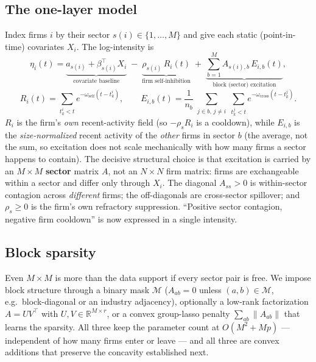 \documentclass[11pt]{article}
\theoremstyle{plain}
\theoremstyle{definition}
\theoremstyle{remark}
\newcommand{\R}{\mathbb{R}}
\begin{document}
\subsection{The one-layer model}
Index firms $i$ by their sector $s(i)\in\{1,\dots,M\}$ and give each static (point-in-time) covariates $X_i$. The log-intensity is
\begin{equation}
\eta_i(t)=\underbrace{a_{s(i)}+\beta_{s(i)}^\top X_i}_{\text{covariate baseline}}
\;-\;\underbrace{\rho_{s(i)}\,R_i(t)}_{\text{firm self-inhibition}}
\;+\;\underbrace{\sum_{b=1}^{M} A_{s(i),b}\,E_{i,b}(t)}_{\text{block (sector) excitation}},
\label{eq:bh_eta}
\end{equation}
\begin{equation}
R_i(t)=\!\!\sum_{t^i_k<t}\! e^{-\omega_{\mathrm{self}}(t-t^i_k)},\qquad
E_{i,b}(t)=\frac{1}{n_b}\!\!\sum_{\substack{j\in b,\,j\ne i}}\sum_{t^j_k<t}\! e^{-\omega_{\mathrm{cross}}(t-t^j_k)} .
\label{eq:bh_fields}
\end{equation}
$R_i$ is the firm's \emph{own} recent-activity field (so $-\rho_s R_i$ is a cooldown), while $E_{i,b}$ is the \emph{size-normalized} recent activity of the \emph{other} firms in sector $b$ (the average, not the sum, so excitation does not scale mechanically with how many firms a sector happens to contain). The decisive structural choice is that excitation is carried by an $M\times M$ \textbf{sector} matrix $A$, not an $N\times N$ firm matrix: firms are exchangeable within a sector and differ only through $X_i$. The diagonal $A_{ss}>0$ is within-sector contagion across \emph{different} firms; the off-diagonals are cross-sector spillover; and $\rho_s\ge0$ is the firm's own refractory suppression. ``Positive sector contagion, negative firm cooldown'' is now expressed in a single intensity.

\subsection{Block sparsity}
Even $M\times M$ is more than the data support if every sector pair is free. We impose block structure through a binary mask $\mathcal M$ ($A_{ab}=0$ unless $(a,b)\in\mathcal M$, e.g.\ block-diagonal or an industry adjacency), optionally a low-rank factorization $A=UV^\top$ with $U,V\in\R^{M\times r}$, or a convex group-lasso penalty $\sum_{ab}\|A_{ab}\|$ that learns the sparsity. All three keep the parameter count at $O(M^2+Mp)$ --- independent of how many firms enter or leave --- and all three are convex additions that preserve the concavity established next.
\end{document}
